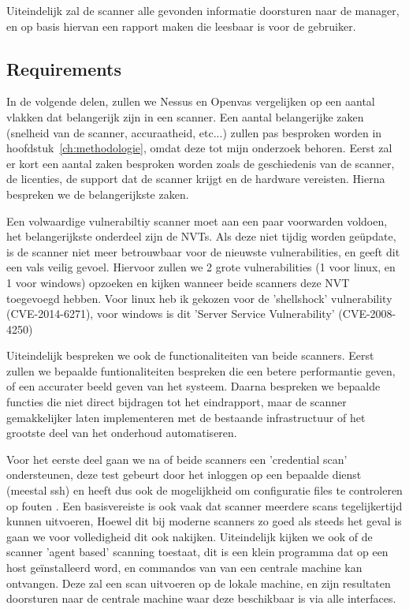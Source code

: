 Uiteindelijk zal de scanner alle gevonden informatie doorsturen naar de manager, en op basis hiervan een rapport maken die leesbaar is voor de gebruiker.

\subsection{Requirements}


In de volgende delen, zullen we Nessus en Openvas vergelijken op een aantal vlakken dat belangerijk zijn in een scanner. Een aantal belangerijke zaken (snelheid van de scanner, accuraatheid, etc...) zullen pas besproken worden in hoofdstuk~\ref{ch:methodologie}, omdat deze tot mijn onderzoek behoren. Eerst zal er kort een aantal zaken besproken worden zoals de geschiedenis van de scanner, de licenties, de support dat de scanner krijgt en de hardware vereisten. Hierna bespreken we de belangerijkste zaken.

Een volwaardige vulnerabiltiy scanner moet aan een paar voorwarden voldoen, het belangerijkste onderdeel zijn de NVTs. Als deze niet tijdig worden geüpdate, is de scanner niet meer betrouwbaar voor de nieuwste vulnerabilities, en geeft dit een vals veilig gevoel. Hiervoor zullen we 2 grote vulnerabilities (1 voor linux, en 1 voor windows) opzoeken en kijken wanneer beide scanners deze NVT toegevoegd hebben. Voor linux heb ik gekozen voor de 'shellshock' vulnerability (CVE-2014-6271), voor windows is dit 'Server Service Vulnerability' (CVE-2008-4250)

Uiteindelijk bespreken we ook de functionaliteiten van beide scanners. Eerst zullen we bepaalde funtionaliteiten bespreken die een betere performantie geven, of een accurater beeld geven van het systeem. Daarna bespreken we bepaalde functies die niet direct bijdragen tot het eindrapport, maar de scanner gemakkelijker laten implementeren met de bestaande infrastructuur of het grootste deel van het onderhoud automatiseren. 

Voor het eerste deel gaan we na of beide scanners een 'credential scan' ondersteunen, deze test gebeurt door het inloggen op een bepaalde dienst (meestal ssh) en heeft dus ook de mogelijkheid om configuratie files te controleren op fouten \textcite{Digitalbond}. Een basisvereiste is ook vaak dat scanner meerdere scans tegelijkertijd kunnen uitvoeren, Hoewel dit bij moderne scanners zo goed als steeds het geval is gaan we voor volledigheid dit ook nakijken. Uiteindelijk kijken we ook of de scanner 'agent based' scanning toestaat, dit is een klein programma dat op een host geïnstalleerd word, en commandos van van een centrale machine kan ontvangen. Deze zal een scan uitvoeren op de lokale machine, en zijn resultaten doorsturen naar de centrale machine waar deze beschikbaar is via alle interfaces.

